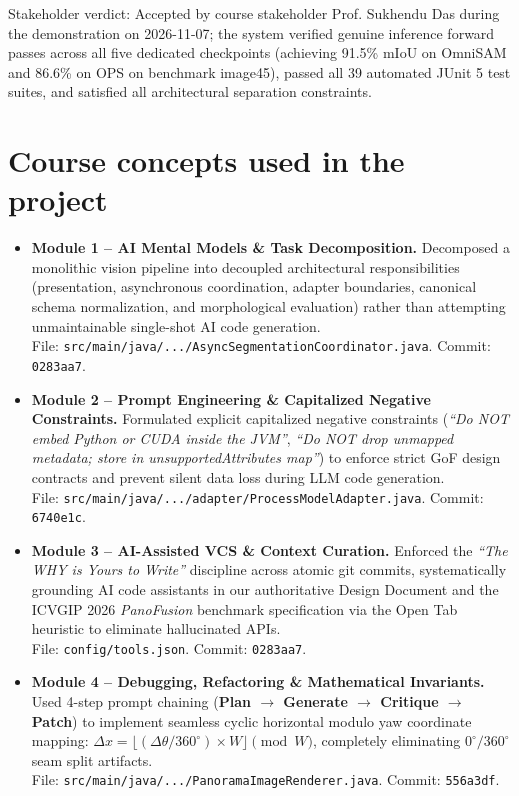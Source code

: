 \documentclass[10pt,a4paper]{article}
\begin{document}
Stakeholder verdict: Accepted by course stakeholder Prof. Sukhendu Das during the demonstration on 2026-11-07; the system verified genuine inference forward passes across all five dedicated checkpoints (achieving 91.5\% mIoU on OmniSAM and 86.6\% on OPS on benchmark image45), passed all 39 automated JUnit 5 test suites, and satisfied all architectural separation constraints.

\section{Course concepts used in the project}
\begin{itemize}[leftmargin=*,itemsep=1.2pt]
  \item \textbf{Module 1 -- AI Mental Models \& Task Decomposition.} Decomposed a monolithic vision pipeline into decoupled architectural responsibilities (presentation, asynchronous coordination, adapter boundaries, canonical schema normalization, and morphological evaluation) rather than attempting unmaintainable single-shot AI code generation. \\
  File: \texttt{src/main/java/.../AsyncSegmentationCoordinator.java}. Commit: \texttt{0283aa7}.
  
  \item \textbf{Module 2 -- Prompt Engineering \& Capitalized Negative Constraints.} Formulated explicit capitalized negative constraints (\textit{``Do NOT embed Python or CUDA inside the JVM''}, \textit{``Do NOT drop unmapped metadata; store in unsupportedAttributes map''}) to enforce strict GoF design contracts and prevent silent data loss during LLM code generation. \\
  File: \texttt{src/main/java/.../adapter/ProcessModelAdapter.java}. Commit: \texttt{6740e1c}.
  
  \item \textbf{Module 3 -- AI-Assisted VCS \& Context Curation.} Enforced the \textit{``The WHY is Yours to Write''} discipline across atomic git commits, systematically grounding AI code assistants in our authoritative Design Document and the ICVGIP 2026 \textit{PanoFusion} benchmark specification via the Open Tab heuristic to eliminate hallucinated APIs. \\
  File: \texttt{config/tools.json}. Commit: \texttt{0283aa7}.
  
  \item \textbf{Module 4 -- Debugging, Refactoring \& Mathematical Invariants.} Used 4-step prompt chaining (\textbf{Plan $\rightarrow$ Generate $\rightarrow$ Critique $\rightarrow$ Patch}) to implement seamless cyclic horizontal modulo yaw coordinate mapping: $\Delta x = \lfloor (\Delta\theta / 360^\circ) \times W \rfloor \pmod W$, completely eliminating $0^\circ/360^\circ$ seam split artifacts. \\
  File: \texttt{src/main/java/.../PanoramaImageRenderer.java}. Commit: \texttt{556a3df}.
  

\end{itemize}
\end{document}
